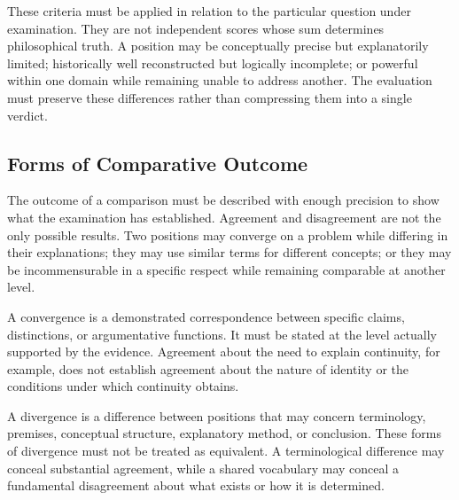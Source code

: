 \label{para:VS.B01.P01.C08.S01.SS05.P010}
These criteria must be applied in relation to the
particular question under examination. They are not
independent scores whose sum determines philosophical
truth. A position may be conceptually precise but
explanatorily limited; historically well reconstructed
but logically incomplete; or powerful within one domain
while remaining unable to address another. The
evaluation must preserve these differences rather than
compressing them into a single verdict.

\begin{center}

\end{center}

\subsection{Forms of Comparative Outcome}
\label{sec:ch08-s01-ss06}

\label{para:VS.B01.P01.C08.S01.SS06.P001}
The outcome of a comparison must be described with enough
precision to show what the examination has established.
Agreement and disagreement are not the only possible
results. Two positions may converge on a problem while
differing in their explanations; they may use similar
terms for different concepts; or they may be
incommensurable in a specific respect while remaining
comparable at another level.

\label{para:VS.B01.P01.C08.S01.SS06.P002}
A convergence is a demonstrated correspondence between
specific claims, distinctions, or argumentative
functions. It must be stated at the level actually
supported by the evidence. Agreement about the need to
explain continuity, for example, does not establish
agreement about the nature of identity or the conditions
under which continuity obtains.

\label{para:VS.B01.P01.C08.S01.SS06.P003}
A divergence is a difference between positions that may
concern terminology, premises, conceptual structure,
explanatory method, or conclusion. These forms of
divergence must not be treated as equivalent. A
terminological difference may conceal substantial
agreement, while a shared vocabulary may conceal a
fundamental disagreement about what exists or how it is
determined.

